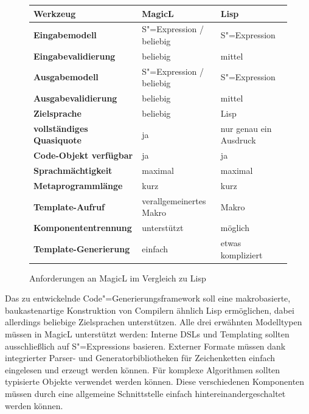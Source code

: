 \documentclass[12pt, a4paper, bibgerm]{scrbook}
\newcommand{\sexp}{S"=Expression}
\newcommand{\sexps}{S"=Expressions}
\newcommand{\cgen}{Code"=Generierung}
\begin{document}
\begin{figure}[h]
\begin{tabular}{|l|l|l|} \hline
\bf Werkzeug                 & \bf MagicL                    & \bf Lisp               \\\hline\hline    
\bf Eingabemodell            & \sexp{} / beliebig            & \sexp{}                \\\hline           
\bf Eingabevalidierung       & beliebig                      & mittel                 \\\hline      
\bf Ausgabemodell            & \sexp{} / beliebig            & \sexp{}                \\\hline      
\bf Ausgabevalidierung       & beliebig                      & mittel                 \\\hline      
\bf Zielsprache              & beliebig                      & Lisp                   \\\hline      
\bf vollständiges Quasiquote & ja                            & nur genau ein Ausdruck \\\hline      
\bf Code-Objekt verfügbar    & ja                            & ja                     \\\hline      
\bf Sprachmächtigkeit        & maximal                       & maximal                \\\hline      
\bf Metaprogrammlänge        & kurz                          & kurz                   \\\hline
\bf Template-Aufruf          & verallgemeinertes Makro       & Makro                  \\\hline      
\bf Komponententrennung      & unterstützt                   & möglich                \\\hline      
\bf Template-Generierung     & einfach                       & etwas kompliziert      \\\hline      
\end{tabular}
\caption{Anforderungen an MagicL im Vergleich zu Lisp}
\label{magicl:fig:reqs_sum}
\end{figure}

Das zu entwickelnde \cgen{}sframework soll eine makrobasierte,
baukastenartige Konstruktion von Compilern ähnlich Lisp ermöglichen,
dabei allerdings beliebige Zielsprachen unterstützen. Alle drei
erwähnten Modelltypen müssen in MagicL unterstützt werden: Interne DSLs
und Templating sollten ausschließlich auf \sexps{} basieren. Externer
Formate müssen dank integrierter Parser- und Generatorbibliotheken für
Zeichenketten einfach eingelesen und erzeugt werden können. Für komplexe
Algorithmen sollten typisierte Objekte verwendet werden können. Diese
verschiedenen Komponenten müssen durch eine allgemeine Schnittstelle
einfach hintereinandergeschaltet werden können.
\end{document}
